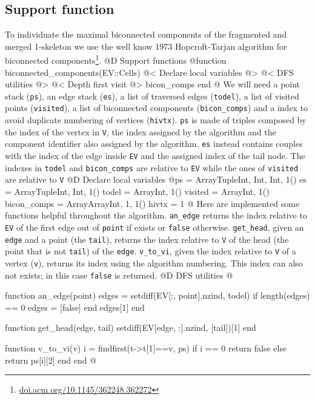 \documentclass[10pt,oneside]{article}
\begin{document}
\subsection{Support function}
\label{sec:biconnected_components}
To individuate the maximal biconnected components of the fragmented and merged 1-skeleton
we use the well know 1973 Hopcroft-Tarjan algorithm for biconnected components\footnote{\url{doi.acm.org/10.1145/362248.362272}}.
@D Support functions
@{function biconnected_components(EV::Cells)
    @< Declare local variables @>
    @< DFS utilities @>
    @< Depth first visit @>
    bicon_comps
end
@}
We will need a point stack (\texttt{ps}), an edge stack (\texttt{es}), a list of traversed edges (\texttt{todel}), a list of 
visited points (\texttt{visited}), a list of biconnected components (\texttt{bicon\_comps}) and a index to avoid duplicate 
numbering of vertices (\texttt{hivtx}). \texttt{ps} is made of triples composed by the index of the vertex in \texttt{V}, 
the index assigned by the algorithm and the component identifier also assigned by the algorithm. \texttt{es} instead 
contains couples with the index of the edge inside \texttt{EV} and the assigned index of the tail node. The indexes 
in \texttt{todel} and \texttt{bicon\_comps} are relative to \texttt{EV} while the ones of \texttt{visited} are
relative to \texttt{V}
@D Declare local variables
@{ps = Array{Tuple{Int, Int, Int}, 1}()
es = Array{Tuple{Int, Int}, 1}()
todel = Array{Int, 1}()
visited = Array{Int, 1}()
bicon_comps = Array{Array{Int, 1}, 1}()
hivtx = 1
@}
Here are implemented some functions helpful throughout the algorithm.
\texttt{an\_edge} returns the index relative to \texttt{EV} of the first edge out of \texttt{point} if exists or 
\texttt{false} otherwise. \texttt{get\_head}, given an \texttt{edge} and a point (the \texttt{tail}), returns the 
index relative to \texttt{V} of the head (the point that is not \texttt{tail}) of the \texttt{edge}. 
\texttt{v\_to\_vi}, given the index relative to \texttt{V} of a vertex (\texttt{v}), returns its index using 
the algorithm numbering. This index can also not exists; in this case \texttt{false} is returned.
@D DFS utilities
@{function an_edge(point)
    edges = setdiff(EV[:, point].nzind, todel)
    if length(edges) == 0
        edges = [false]
    end
    edges[1]
end

function get_head(edge, tail)
    setdiff(EV[edge, :].nzind, [tail])[1]
end

function v_to_vi(v)
    i = findfirst(t->t[1]==v, ps)
    if i == 0
        return false
    else
        return ps[i][2]
    end
end
@}
\end{document}

